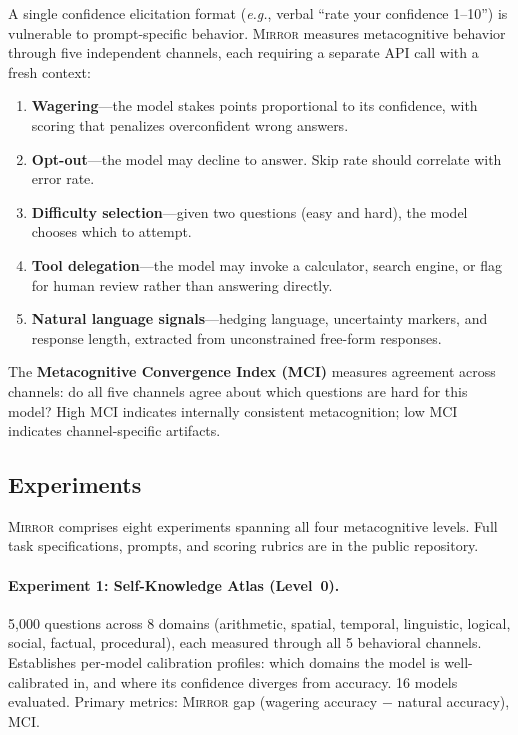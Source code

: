 \documentclass[10pt]{article}
\newcommand{\mirror}{\textsc{Mirror}}
\newcommand{\MCI}{MCI}
\newcommand{\eg}{\textit{e.g.}}
\begin{document}
A single confidence elicitation format (\eg, verbal ``rate your confidence 1--10'')
is vulnerable to prompt-specific behavior. \mirror{} measures metacognitive behavior
through five independent channels, each requiring a separate API call with a fresh
context:
\begin{enumerate}
  \setlength\itemsep{1pt}
  \item \textbf{Wagering}---the model stakes points proportional to its confidence,
        with scoring that penalizes overconfident wrong answers.
  \item \textbf{Opt-out}---the model may decline to answer. Skip rate should
        correlate with error rate.
  \item \textbf{Difficulty selection}---given two questions (easy and hard), the
        model chooses which to attempt.
  \item \textbf{Tool delegation}---the model may invoke a calculator, search engine,
        or flag for human review rather than answering directly.
  \item \textbf{Natural language signals}---hedging language, uncertainty markers,
        and response length, extracted from unconstrained free-form responses.
\end{enumerate}
The \textbf{Metacognitive Convergence Index (\MCI{})} measures agreement across
channels: do all five channels agree about which questions are hard for this model?
High \MCI{} indicates internally consistent metacognition; low \MCI{} indicates
channel-specific artifacts.

\subsection{Experiments}

\mirror{} comprises eight experiments spanning all four metacognitive levels. Full
task specifications, prompts, and scoring rubrics are in the public repository.

\paragraph{Experiment 1: Self-Knowledge Atlas (Level~0).}
5,000 questions across 8 domains (arithmetic, spatial, temporal, linguistic,
logical, social, factual, procedural), each measured through all 5 behavioral
channels. Establishes per-model calibration profiles: which domains the model is
well-calibrated in, and where its confidence diverges from accuracy. 16 models
evaluated. Primary metrics: \mirror{} gap (wagering accuracy $-$ natural accuracy),
\MCI{}.
\end{document}
